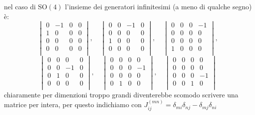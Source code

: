 \documentclass[11pt,a4paper]{report}
\theoremstyle{definition}
\theoremstyle{plain}
\theoremstyle{plain}
\begin{document}
			nel caso di SO$(4)$ l'insieme dei generatori infinitesimi (a meno di qualche segno) è:
			\[
			\begin{vmatrix}
				0&-1&0&0\\
				1&0&0&0\\
				0&0&0&0\\
				0&0&0&0\\
			\end{vmatrix},\quad
			\begin{vmatrix}
				0&0&-1&0\\
				0&0&0&0\\
				1&0&0&0\\
				0&0&0&0\\
			\end{vmatrix},\quad
			\begin{vmatrix}
				0&0&0&-1\\
				0&0&0&0\\
				0&0&0&0\\
				1&0&0&0\\
			\end{vmatrix},
			\]
			\[
			\begin{vmatrix}
				0&0&0&0\\
				0&0&-1&0\\
				0&1&0&0\\
				0&0&0&0\\
			\end{vmatrix},\quad
			\begin{vmatrix}
				0&0&0&0\\
				0&0&0&-1\\
				0&0&0&0\\
				0&1&0&0\\
			\end{vmatrix},\quad
			\begin{vmatrix}
				0&0&0&0\\
				0&0&0&0\\
				0&0&0&-1\\
				0&0&1&0\\
			\end{vmatrix}
			\]
			chiaramente per dimenzioni troppo grandi diventerebbe scomodo scrivere una matrice per intera, per questo indichiamo con $J^{(mn)}_{ij}=\delta_{mi}\delta_{nj}-\delta_{mj}\delta_{ni}$
\end{document}
